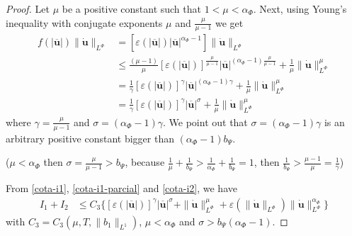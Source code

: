 \documentclass[twoside]{article}
\theoremstyle{remark}
\newcommand{\orlnor}{\|_{L^{\Phi}}}
\renewcommand{\b}[1]{\boldsymbol{#1}}
\renewcommand{\leq}{\leqslant}
\renewcommand{\geq}{\geqslant}
\begin{document}
\begin{proof}
Let $\mu$ be a positive constant such that $1<\mu<\alpha_{\Phi}$. 
Next, using Young's inequality with conjugate exponents $\mu$ and $\frac{\mu}{\mu-1}$ 
 we get
\begin{equation}\label{cota-i1-parcial}
 \begin{split}
f(|\b{\overline{u}}|) \|\b{\dot{u}}\orlnor
&=
[\varepsilon(|\b{\overline{u}}|)
|\b{\overline{u}}|^{\alpha_{\Phi}-1}]   \|\b{\dot{u}}\orlnor
\\
&\leq 
\frac{(\mu-1)}{\mu}
[\varepsilon(|\b{\overline{u}}|)]^{\frac{\mu}{\mu-1}}
|\b{\overline{u}}|^{(\alpha_{\Phi}-1)\frac{\mu}{\mu-1}}
+\frac{1}{\mu} \|\b{\dot{u}}\orlnor^{\mu}
\\
&=
\frac{1}{\gamma}
[\varepsilon(|\b{\overline{u}}|)]^{\gamma}
|\b{\overline{u}}|^{(\alpha_{\Phi}-1)\gamma}
+\frac{1}{\mu} \|\b{\dot{u}}\orlnor^{\mu}
\\
&=
\frac{1}{\gamma}
[\varepsilon(|\b{\overline{u}}|)]^{\gamma}
|\b{\overline{u}}|^{\sigma}
+\frac{1}{\mu} \|\b{\dot{u}}\orlnor^{\mu}
\end{split}
\end{equation}
where $\gamma=\frac{\mu}{\mu-1}$ and $\sigma=(\alpha_{\Phi}-1)\gamma$. 
We point out that $\sigma=(\alpha_{\Phi}-1)\gamma$ is an arbitrary positive constant bigger than $(\alpha_{\Phi}-1)b_{\Psi}$.

($\mu<\alpha_{\Phi}$ then $\sigma=\frac{\mu}{\mu-1}>b_{\Psi}$, because
$\frac{1}{\mu}+\frac{1}{b_{\Psi}}>\frac{1}{\alpha_{\Phi}}+\frac{1}{b_{\Psi}}=1$, then
$\frac{1}{b_{\Psi}}>\frac{\mu-1}{\mu}=\frac{1}{\gamma}$)

From \eqref{cota-i1}, \eqref{cota-i1-parcial} and \eqref{cota-i2},
we have
\begin{equation}\label{cota-i1-i2}
\begin{split}
I_1+I_2
&
\leq C_3
\bigg\{ 
[\varepsilon(|\b{\overline{u}}|)]^{\gamma}
|\b{\overline{u}}|^{\sigma}
+ \|\b{\dot{u}}\orlnor^{\mu}
+ \varepsilon(\|\b{\dot{u}}\orlnor)\|\b{\dot{u}}\orlnor^{\alpha_{\Phi}}
\bigg\}
\end{split}
\end{equation}
with $C_3= C_3(\mu,T, \|b_1\|_{L^1} )$, $\mu<\alpha_{\Phi}$ and $\sigma>b_{\Psi}(\alpha_{\Phi}-1)$.





\end{proof}
\end{document}
